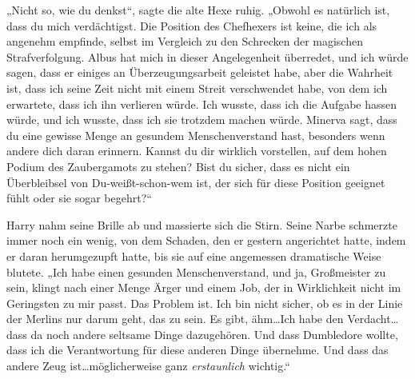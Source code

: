 „Nicht so, wie du denkst“, sagte die alte Hexe ruhig. „Obwohl es natürlich ist, dass du mich verdächtigst. Die Position des Chefhexers ist keine, die ich als angenehm empfinde, selbst im Vergleich zu den Schrecken der magischen Strafverfolgung. Albus hat mich in dieser Angelegenheit überredet, und ich würde sagen, dass er einiges an Überzeugungsarbeit geleistet habe, aber die Wahrheit ist, dass ich seine Zeit nicht mit einem Streit verschwendet habe, von dem ich erwartete, dass ich ihn verlieren würde. Ich wusste, dass ich die Aufgabe hassen würde, und ich wusste, dass ich sie trotzdem machen würde. Minerva sagt, dass du eine gewisse Menge an gesundem Menschenverstand hast, besonders wenn andere dich daran erinnern. Kannst du dir wirklich vorstellen, auf dem hohen Podium des Zaubergamots zu stehen? Bist du sicher, dass es nicht ein Überbleibsel von Du-weißt-schon-wem ist, der sich für diese Position geeignet fühlt oder sie sogar begehrt?“

Harry nahm seine Brille ab und massierte sich die Stirn. Seine Narbe schmerzte immer noch ein wenig, von dem Schaden, den er gestern angerichtet hatte, indem er daran herumgezupft hatte, bis sie auf eine angemessen dramatische Weise blutete.
„Ich habe einen gesunden Menschenverstand, und ja, Großmeister zu sein, klingt nach einer Menge Ärger und einem Job, der in Wirklichkeit nicht im Geringsten zu mir passt. Das Problem ist. Ich bin nicht sicher, ob es in der Linie der Merlins nur darum geht, das zu sein. Es gibt, ähm…Ich habe den Verdacht…dass da noch andere seltsame Dinge dazugehören. Und dass Dumbledore wollte, dass ich die Verantwortung für diese anderen Dinge übernehme. Und dass das andere Zeug ist…möglicherweise ganz \emph{erstaunlich} wichtig.“

